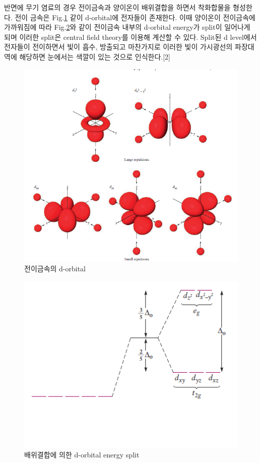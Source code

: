 \documentclass[%
 reprint,
 amsmath,amssymb,
 aps,
]{revtex4-2}
\begin{document}
반면에 무기 염료의 경우 전이금속과 양이온이 배위결합을 하면서 착화합물을 형성한다. 전이 금속은 Fig.\ref{fig:d_orbital} 같이 d-orbital에 전자들이 존재한다. 이때 양이온이 전이금속에 가까워짐에 따라 Fig.\ref{fig:energy_splitting}와 같이 전이금속 내부의 d-orbital energy가 split이 일어나게 되며 이러한 split은 central field theory를 이용해 계산할 수 있다. Split된 d level에서 전자들이 전이하면서 빛이 흡수, 방출되고 마찬가지로 이러한 빛이 가시광선의 파장대역에 해당하면 눈에서는 색깔이 있는 것으로 인식한다.[2]
\begin{figure}[htbp]
	\includegraphics[width = 0.6\linewidth]{d_orbital.png}%
	\caption{\label{fig:d_orbital}전이금속의 d-orbital}
\end{figure}
\begin{figure}[htbp]
	\includegraphics[width = 0.6\linewidth]{energy_splitting.png}%
	\caption{\label{fig:energy_splitting}배위결합에 의한 d-orbital energy split}
\end{figure}
\end{document}
